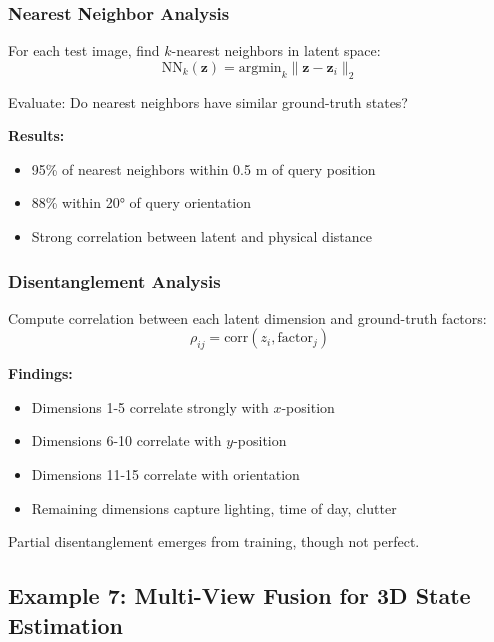 \subsubsection{Nearest Neighbor Analysis}

For each test image, find $k$-nearest neighbors in latent space:
\begin{equation}
\text{NN}_k(\mathbf{z}) = \text{argmin}_{k} \| \mathbf{z} - \mathbf{z}_i \|_2
\label{eq:knn}
\end{equation}

Evaluate: Do nearest neighbors have similar ground-truth states?

\textbf{Results:}
\begin{itemize}
    \item 95\% of nearest neighbors within 0.5 m of query position
    \item 88\% within 20° of query orientation
    \item Strong correlation between latent and physical distance
\end{itemize}

\subsubsection{Disentanglement Analysis}

Compute correlation between each latent dimension and ground-truth factors:
\begin{equation}
\rho_{ij} = \text{corr}(z_i, \text{factor}_j)
\label{eq:disentanglement}
\end{equation}

\textbf{Findings:}
\begin{itemize}
    \item Dimensions 1-5 correlate strongly with $x$-position
    \item Dimensions 6-10 correlate with $y$-position
    \item Dimensions 11-15 correlate with orientation
    \item Remaining dimensions capture lighting, time of day, clutter
\end{itemize}

Partial disentanglement emerges from training, though not perfect.


\subsection{Example 7: Multi-View Fusion for 3D State Estimation}


